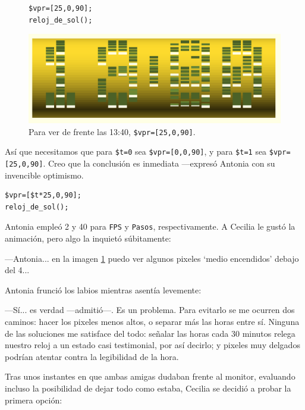 \begin{figure}[ht]
  \begin{minipage}[]{.3\textwidth}
\begin{lstlisting}
$vpr=[25,0,90];
reloj_de_sol();
\end{lstlisting}%
  \end{minipage}\hfill
  \begin{minipage}[]{.68\textwidth}
    \centering
  \includegraphics[width=1\textwidth]{imagenes/animacion_13_40}  
  \end{minipage}
  \caption{Para ver de frente las 13:40, \texttt{\$vpr=[25,0,90]}.}
  \label{fig:animacion_13_40}
\end{figure}




\guillemotright Así que necesitamos que para \texttt{\$t=0} sea
\texttt{\$vpr=[0,0,90]}, y para \texttt{\$t=1} sea
\texttt{\$vpr=[25,0,90]}. Creo que la conclusión es inmediata
---expresó Antonia con su invencible optimismo.

\begin{lstlisting}
$vpr=[$t*25,0,90];
reloj_de_sol();
\end{lstlisting}%

Antonia empleó 2 y 40 para \texttt{FPS} y \texttt{Pasos},
respectivamente. A Cecilia le gustó la animación, pero algo la
inquietó súbitamente:

---Antonia... en la imagen \ref{fig:animacion_13_40} puedo ver algunos
pixeles `medio encendidos' debajo del 4...

Antonia frunció los labios mientras asentía levemente:

---Sí... es verdad ---admitió---. Es un problema. Para evitarlo se me
ocurren dos caminos: hacer los pixeles menos altos, o separar más las
horas entre sí. Ninguna de las soluciones me satisface del todo:
señalar las horas cada 30 minutos relega nuestro reloj a un estado
casi testimonial, por así decirlo; y pixeles muy delgados podrían
atentar contra la legibilidad de la hora.

Tras unos instantes en que ambas amigas dudaban frente al monitor,
evaluando incluso la posibilidad de dejar todo como estaba, Cecilia se
decidió a probar la primera opción:

